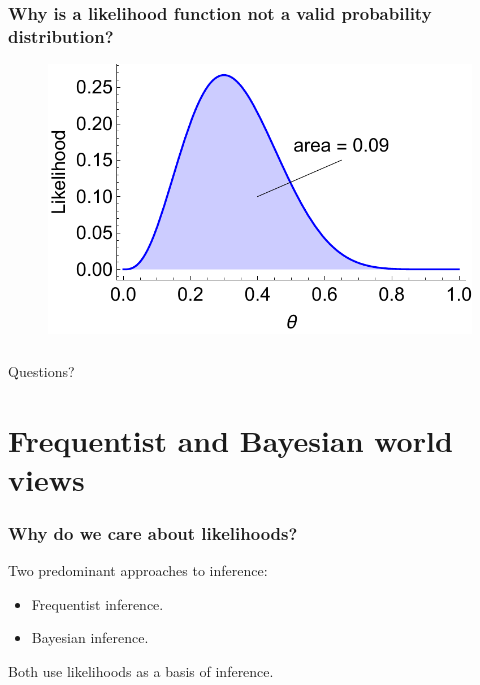 \documentclass[handout]{beamer}
\begin{document}
\begin{frame}
	\frametitle{Why is a likelihood function not a valid probability distribution?}
	
	\begin{figure}[h]
		\centerline{\includegraphics[width=1\textwidth]{animations_figures/binomial_likelihood_area.pdf}}
	\end{figure}
	
\end{frame}

\begin{frame}
	\frametitle{}
	{\Huge Questions?}
\end{frame}

\section{Frequentist and Bayesian world views}
\frame{\tableofcontents[currentsection]}

\begin{frame}
	\frametitle{Why do we care about likelihoods?}
	Two predominant approaches to inference:
	
	\begin{itemize}
		\item Frequentist inference.
		\item Bayesian inference.
	\end{itemize}
	
	Both use likelihoods as a basis of inference.
	
\end{frame}
\end{document}
